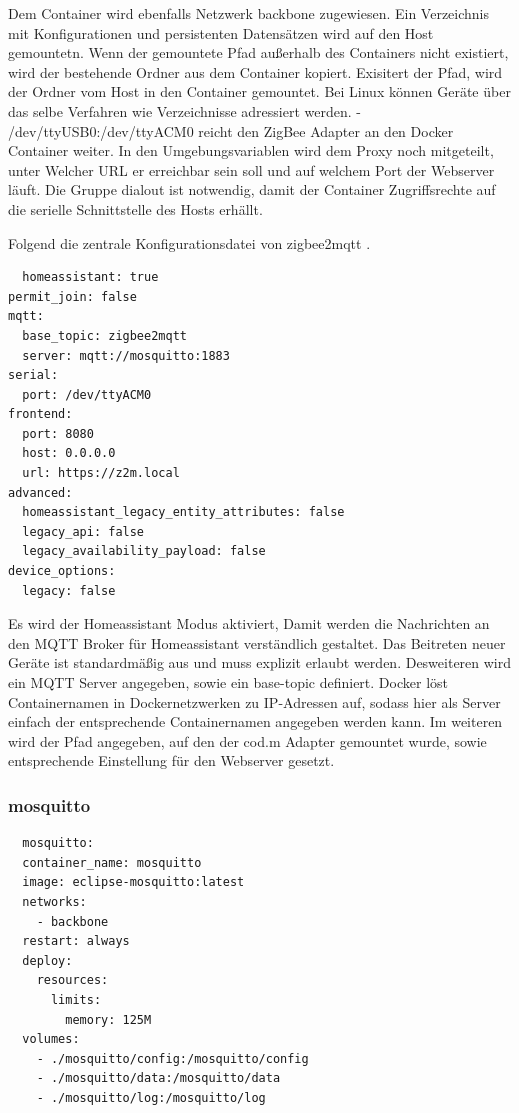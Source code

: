 Dem Container wird ebenfalls Netzwerk \grqq backbone \grqq{} zugewiesen. Ein Verzeichnis mit Konfigurationen und persistenten Datensätzen wird auf den Host gemountetn. Wenn der gemountete Pfad außerhalb des Containers nicht existiert, wird der 
bestehende Ordner aus dem Container kopiert. Exisitert der Pfad, wird der Ordner vom Host in den Container gemountet. 
Bei Linux können Geräte über das selbe Verfahren wie Verzeichnisse adressiert werden. \grqq - /dev/ttyUSB0:/dev/ttyACM0 \grqq{} reicht den ZigBee Adapter an 
den Docker Container weiter.
In den Umgebungsvariablen wird dem Proxy noch mitgeteilt, unter Welcher URL er erreichbar sein soll und auf welchem Port der Webserver läuft. Die Gruppe 
\grqq dialout \grqq{} ist notwendig, damit der Container Zugriffsrechte auf die serielle Schnittstelle des Hosts erhällt.

Folgend die zentrale Konfigurationsdatei von \grqq zigbee2mqtt \grqq{}.
\begin{lstlisting}
  homeassistant: true
permit_join: false
mqtt:
  base_topic: zigbee2mqtt
  server: mqtt://mosquitto:1883
serial:
  port: /dev/ttyACM0
frontend:
  port: 8080
  host: 0.0.0.0
  url: https://z2m.local
advanced:
  homeassistant_legacy_entity_attributes: false
  legacy_api: false
  legacy_availability_payload: false
device_options:
  legacy: false
\end{lstlisting}

Es wird der \grqq Homeassistant \grqq{} Modus aktiviert, Damit werden die Nachrichten an den MQTT Broker für Homeassistant verständlich gestaltet.
Das Beitreten neuer Geräte ist standardmäßig aus und muss explizit erlaubt werden. Desweiteren wird ein MQTT Server angegeben, sowie ein \grqq base-topic \grqq{}
definiert. Docker löst Containernamen in Dockernetzwerken zu IP-Adressen auf, sodass hier als Server einfach der entsprechende Containernamen angegeben werden
kann. Im weiteren wird der Pfad angegeben, auf den der cod.m Adapter gemountet wurde, sowie entsprechende Einstellung für den Webserver gesetzt.

\subsubsection{mosquitto}

\begin{lstlisting}
  mosquitto:
  container_name: mosquitto
  image: eclipse-mosquitto:latest
  networks:
    - backbone
  restart: always
  deploy:
    resources:
      limits:
        memory: 125M
  volumes:
    - ./mosquitto/config:/mosquitto/config
    - ./mosquitto/data:/mosquitto/data
    - ./mosquitto/log:/mosquitto/log
\end{lstlisting}

